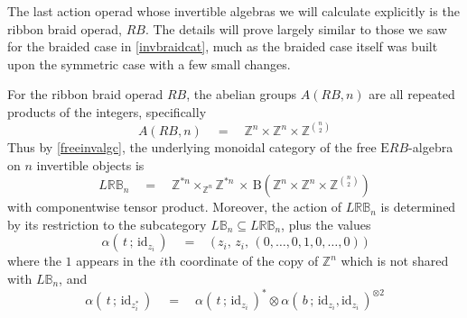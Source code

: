 \documentclass{amsbook} %
\newcommand{\id}{\textrm{id}}
\numberwithin{section}{chapter}
\begin{document}
The last action operad whose invertible algebras we will calculate explicitly is the ribbon braid operad, $RB$. The details will prove largely similar to those we saw for the braided case in \cref{invbraidcat}, much as the braided case itself was built upon the symmetric case with a few small changes. 

\begin{prop} \label{invribboncat} For the ribbon braid operad $RB$, the abelian groups $A(RB,n)$ are all repeated products of the integers, specifically
\[ A(RB,n) \quad = \quad \mathbb{Z}^{n} \times \mathbb{Z}^{n} \times \mathbb{Z}^{{n}\choose{2}} \]
Thus by \cref{freeinvalgc}, the underlying monoidal category of the free $\mathrm{E}RB$-algebra on $n$ invertible objects is
\[ L\mathbb{RB}_n \quad = \quad \mathbb{Z}^{\ast n} \times_{\mathbb{Z}^n} \mathbb{Z}^{\ast n}  \, \times \, \mathrm{B}(\mathbb{Z}^{n} \times \mathbb{Z}^{n} \times \mathbb{Z}^{{n}\choose{2}}) \]
with componentwise tensor product. Moreover, the action of $L\mathbb{RB}_n$ is determined by its restriction to the subcategory $L\mathbb{B}_n \subseteq L\mathbb{RB}_n$, plus the values
\[ \alpha( \, t \, ; \, \id_{z_i} \, ) \quad = \quad \big( \, z_i, \, z_i, \, (0,\ldots,0, 1, 0,\ldots,0) \, \big) \]
where the $1$ appears in the $i$th coordinate of the copy of $\mathbb{Z}^{n}$ which is not shared with $L\mathbb{B}_n$, and
\[ \alpha( \, t \, ; \, \id_{z_i^*} \, ) \quad = \quad \alpha( \, t \, ; \, \id_{z_i} \, )^* \otimes \alpha( \, b \, ; \, \id_{z_i}, \id_{z_i} \, )^{\otimes 2} \]
\end{prop}
\end{document}

